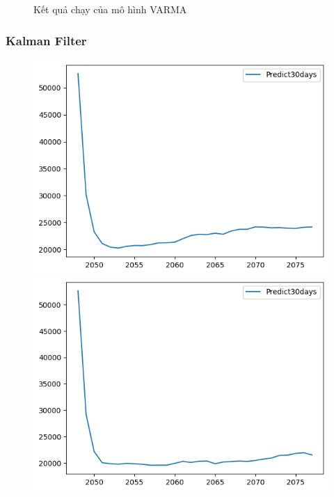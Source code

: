 \begin{figure}[H]
\begin{minipage}{0.15\textwidth}
    \end{minipage}
    \hfill
    
    \caption{Kết quả chạy của mô hình VARMA}
    \label{fig:varma_predicted}
\end{figure}




\subsubsection{Kalman Filter}
\begin{figure}[H]
    \centering
    \begin{minipage}{0.15\textwidth}
    \centering
    \includegraphics[width=1\textwidth]{resources/chapter-5/predicted/KF_BIDV_7_3_30days.png}
    \end{minipage}
    \hfill
    \begin{minipage}{0.15\textwidth}
    \centering
    \includegraphics[width=1\textwidth]{resources/chapter-5/predicted/KF_BIDV_8_2_30days.png}

\end{minipage}
\end{figure}
